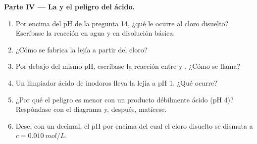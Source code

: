 \begin{problem}
\medskip
\noindent\textbf{Parte IV --- La  y el peligro del ácido.}
\begin{enumerate}[resume]
  \item Por encima del pH de la pregunta 14, ¿qué le ocurre al cloro
        disuelto? Escríbase la reacción en agua y en disolución básica.
  \item ¿Cómo se fabrica la lejía a partir del cloro?
  \item Por debajo del mismo pH, escríbase la reacción entre  y
        . ¿Cómo se llama?
  \item Un limpiador ácido de inodoros lleva la lejía a pH 1. ¿Qué ocurre?
  \item ¿Por qué el peligro es menor con un producto débilmente ácido
        (pH 4)? Respóndase con el diagrama y, después, matícese.
  \item Dese, con un decimal, el pH por encima del cual el cloro disuelto
        se dismuta a $c = \qty{0.010}{mol/L}$.
\end{enumerate}
\end{problem}
